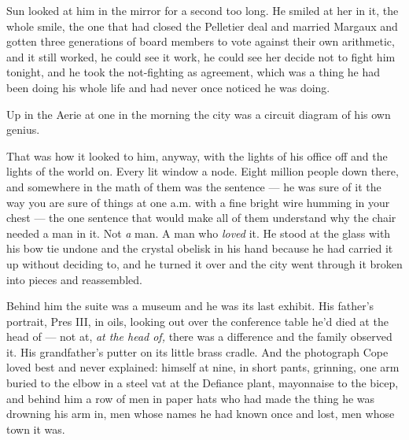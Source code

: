 \documentclass[11pt,openany]{book}
\newcommand{\scenebreak}{\par\vspace{0.5\baselineskip}\begin{center}\textasteriskcentered\quad\textasteriskcentered\quad\textasteriskcentered\end{center}\vspace{0.5\baselineskip}\par}
\begin{document}
Sun looked at him in the mirror for a second too long. He smiled at her in it, the whole smile, the one that had closed the Pelletier deal and married Margaux and gotten three generations of board members to vote against their own arithmetic, and it still worked, he could see it work, he could see her decide not to fight him tonight, and he took the not-fighting as agreement, which was a thing he had been doing his whole life and had never once noticed he was doing.


\scenebreak


Up in the Aerie at one in the morning the city was a circuit diagram of his own genius.

That was how it looked to him, anyway, with the lights of his office off and the lights of the world on. Every lit window a node. Eight million people down there, and somewhere in the math of them was the sentence --- he was sure of it the way you are sure of things at one a.m. with a fine bright wire humming in your chest --- the one sentence that would make all of them understand why the chair needed a man in it. Not \textit{a} man. A man who \textit{loved} it. He stood at the glass with his bow tie undone and the crystal obelisk in his hand because he had carried it up without deciding to, and he turned it over and the city went through it broken into pieces and reassembled.

Behind him the suite was a museum and he was its last exhibit. His father's portrait, Pres III, in oils, looking out over the conference table he'd died at the head of --- not at, \textit{at the head of,} there was a difference and the family observed it. His grandfather's putter on its little brass cradle. And the photograph Cope loved best and never explained: himself at nine, in short pants, grinning, one arm buried to the elbow in a steel vat at the Defiance plant, mayonnaise to the bicep, and behind him a row of men in paper hats who had made the thing he was drowning his arm in, men whose names he had known once and lost, men whose town it was.
\end{document}
